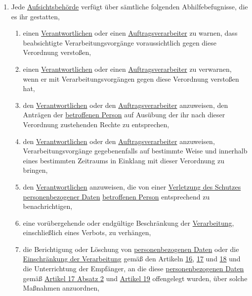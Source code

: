 \begin{enumerate}
\begin{enumerate}
  \end{enumerate}

  \item Jede \hyperref[itm:04-21]{Aufsichtsbehörde} verfügt über sämtliche folgenden Abhilfebefugnisse, die es ihr gestatten,
  \label{itm:58-2}

  \begin{enumerate}
  
    \item einen \hyperref[itm:04-7]{Verantwortlichen} oder einen \hyperref[itm:04-8]{Auftragsverarbeiter} zu warnen, dass beabsichtigte Verarbeitungsvorgänge
     voraussichtlich gegen diese Verordnung verstoßen,
    \label{itm:58-2a}

    \item einen \hyperref[itm:04-7]{Verantwortlichen} oder einen \hyperref[itm:04-8]{Auftragsverarbeiter} zu verwarnen, wenn er mit Verarbeitungsvorgängen gegen
     diese Verordnung verstoßen hat,
    \label{itm:58-2b}

    \item den \hyperref[itm:04-7]{Verantwortlichen} oder den \hyperref[itm:04-8]{Auftragsverarbeiter} anzuweisen, den Anträgen der \hyperref[itm:04-1]{betroffenen Person} auf Ausübung
     der ihr nach dieser Verordnung zustehenden Rechte zu entsprechen,
    \label{itm:58-2c}

    \item den \hyperref[itm:04-7]{Verantwortlichen} oder den \hyperref[itm:04-8]{Auftragsverarbeiter} anzuweisen, Verarbeitungsvorgänge gegebenenfalls auf
     bestimmte Weise und innerhalb eines bestimmten Zeitraums in Einklang mit dieser Verordnung zu bringen,
    \label{itm:58-2d}

    \item den \hyperref[itm:04-7]{Verantwortlichen} anzuweisen, die von einer \hyperref[itm:04-12]{Verletzung des Schutzes personenbezogener Daten} \hyperref[itm:04-1]{betroffenen
     Person} entsprechend zu benachrichtigen,
    \label{itm:58-2e}

    \item eine vorübergehende oder endgültige Beschränkung der \hyperref[itm:04-2]{Verarbeitung}, einschließlich eines Verbots, zu
     verhängen,
    \label{itm:58-2f}

    \item die Berichtigung oder Löschung von \hyperref[itm:04-1]{personenbezogenen Daten} oder die \hyperref[itm:04-3]{Einschränkung der Verarbeitung} gemäß den
     Artikeln \hyperref[ch:16]{16}, \hyperref[ch:17]{17} und \hyperref[ch:17]{18} und die Unterrichtung der Empfänger,
     an die diese \hyperref[itm:04-1]{personenbezogenen Daten} gemäß \hyperref[itm:17-2]{Artikel 17 Absatz 2} und \hyperref[ch:19]
     {Artikel 19} offengelegt wurden, über solche Maßnahmen anzuordnen,
    \label{itm:58-2g}


\end{enumerate}
\end{enumerate}
